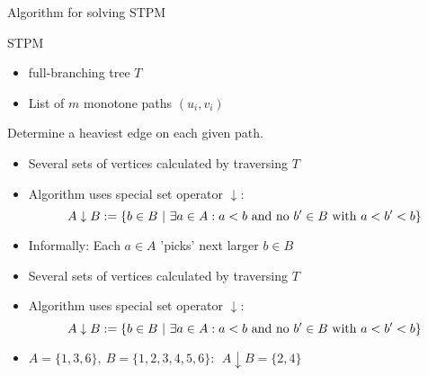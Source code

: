 \documentclass[18pt]{beamer}
\begin{document}
\begin{frame}{Algorithm for solving STPM}

	\begin{block}{STPM}
	 \begin{itemize}
	 	\item full-branching tree $T$
	 	\item List of $m$ monotone paths $(u_i,v_i)$
	 \end{itemize}
 	Determine a heaviest edge on each given path.
	\end{block}
	\bigskip
	\pause
	\begin{overprint}
	\begin{itemize}
	\item  Several sets of vertices calculated by traversing $T$
	\item  Algorithm uses special {\color{blue}set operator} $\downarrow$:
	\[
		A \downarrow B := \{ b \in B \ | \ \exists a \in A: a < b \textup{ and no } b'\in B \textup{ with } a < b' < b \} 
	\]
	\item Informally: Each $a \in A$ 'picks' next larger $b \in B$ 
	\end{itemize}
	\begin{itemize}
		\item  Several sets of vertices calculated by traversing $T$
		\item  Algorithm uses special {\color{blue}set operator} $\downarrow$:
		\[
		A \downarrow B := \{ b \in B \ | \ \exists a \in A: a < b \textup{ and no } b'\in B \textup{ with } a < b' < b \} 
		\]
		\item $A = \{1,3,6\}, \ B = \{1,2,3,4,5,6\}: \ \ A \downarrow B = \{2,4\}$ 
	\end{itemize}
	\end{overprint}
\end{frame}
\end{document}
